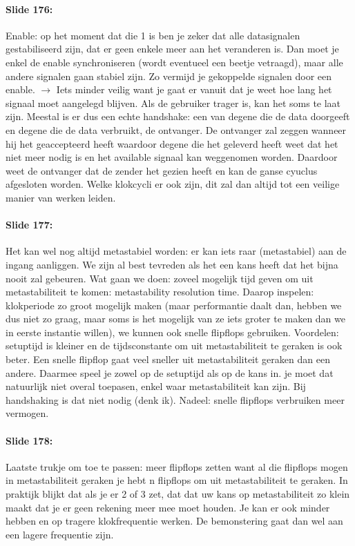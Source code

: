 \documentclass[10pt,a4paper]{book}
\begin{document}
\paragraph{Slide 176:} Enable: op het moment dat die 1 is ben je zeker dat alle datasignalen gestabiliseerd zijn, dat er geen enkele meer aan het veranderen is. Dan moet je enkel de enable synchroniseren (wordt eventueel een beetje vetraagd), maar alle andere signalen gaan stabiel zijn. Zo vermijd je gekoppelde signalen door een enable. $\rightarrow$ Iets minder veilig want je gaat er vanuit dat je weet hoe lang het signaal moet aangelegd blijven. Als de gebruiker trager is, kan het soms te laat zijn. Meestal is er dus een echte handshake: een van degene die de data doorgeeft en degene die de data verbruikt, de ontvanger. De ontvanger zal zeggen wanneer hij het geaccepteerd heeft waardoor degene die het geleverd heeft weet dat het niet meer nodig is en het available signaal kan weggenomen worden. Daardoor weet de ontvanger dat de zender het gezien heeft en kan de ganse cyuclus afgesloten worden. Welke klokcycli er ook zijn, dit zal dan altijd tot een veilige manier van werken leiden. 

\paragraph{Slide 177:} Het kan wel nog altijd metastabiel worden: er kan iets raar (metastabiel) aan de ingang aanliggen. We zijn al best tevreden als het een kans heeft dat het bijna nooit zal gebeuren. Wat gaan we doen: zoveel mogelijk tijd geven om uit metastabiliteit te komen: metastability resolution time. Daarop inspelen: klokperiode zo groot mogelijk maken (maar performantie daalt dan, hebben we dus niet zo graag, maar soms is het mogelijk van ze iets groter te maken dan we in eerste instantie willen), we kunnen ook snelle flipflops gebruiken. Voordelen: setuptijd is kleiner en de tijdsconstante om uit metastabiliteit te geraken is ook beter. Een snelle flipflop gaat veel sneller uit metastabiliteit geraken dan een andere. Daarmee speel je zowel op de setuptijd als op de kans in. je moet dat natuurlijk niet overal toepasen, enkel waar metastabiliteit kan zijn. Bij handshaking is dat niet nodig (denk ik). Nadeel: snelle flipflops verbruiken meer vermogen.

\paragraph{Slide 178:} Laatste trukje om toe te passen: meer flipflops zetten want al die flipflops mogen in metastabiliteit geraken je hebt n flipflops om uit metastabiliteit te geraken. In praktijk blijkt dat als je er 2 of 3 zet, dat dat uw kans op metastabiliteit zo klein maakt dat je er geen rekening meer mee moet houden. Je kan er ook minder hebben en op tragere klokfrequentie werken. De bemonstering gaat dan wel aan een lagere frequentie zijn. 
\end{document}
